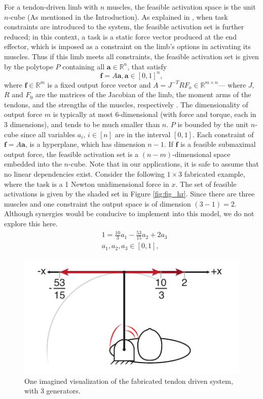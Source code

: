 \label{s:methods}
For a tendon-driven limb with $n$ muscles, the feasible activation space is the unit $n$-cube (As mentioned in the Introduction). As explained in \cite{Valero-Cuevas2009mathematical}, when task constraints are introduced to the system, the feasible activation set is further reduced; in this context, a task is a static force vector produced at the end effector, which is imposed as a constraint on the limb's options in activating its muscles. Thus if this limb meets all constraints, the feasible activation set is given by the polytope $P$ containing all $\textbf{a} \in \mathbb{R}^n$, that satisfy
\[\textbf{f} = A\textbf{a}, \textbf{a} \in [0,1]^n,\]
where $\textbf{f} \in \mathbb{R}^m$ is a fixed output force vector and $A = J^{-T}RF_o \in \mathbb{R}^{m \times n}$--- where $J$, $R$ and $F_0$ are the matrices of the Jacobian of the limb, the moment arms of the tendons, and the strengths of the muscles, respectively \cite{Valero-Cuevas1998Large,Valero-Cuevas2009mathematical}.
The dimensionality of output force $m$ is typically at most 6-dimensional (with force and torque, each in 3 dimensions), and tends to be much smaller than $n$.
$P$ is bounded by the unit $n$-cube since all variables $a_i$, $i \in [n]$ are in the interval $[0,1]$. Each constraint of $\textbf{f}= A \textbf{a}$, is a hyperplane, which has dimension $n-1$.
If $\textbf{f}$ is a feasible submaximal output force, the feasible activation set is a $(n-m)$-dimensional space embedded into the $n$-cube.
Note that in our applications, it is safe to assume that no linear dependencies exist.
Consider the following $1 \times 3$ fabricated example, where the task is a 1 Newton unidimensional force in $x$. The set of feasible activations is given by the shaded set in Figure \ref{fig:fig_hr}. Since there are three muscles and one constraint the output space is of dimension $(3-1) = 2$.
Although synergies would be conducive to implement into this model, we do not explore this here.
\begin{align*}
&1 = \frac{10}{3}a_1 - \frac{53}{15}a_2 + 2a_3 \\
&a_1, a_2, a_3 \in [0,1],
\end{align*}

\begin{figure}[h]
  \label{fig:schematic_arm}
  \centering
  \includegraphics{figs/schematic_arm_1D.pdf}
  \caption{One imagined visualization of the fabricated tendon driven system, with 3 generators.}
  \label{fig:finger}
\end{figure}


